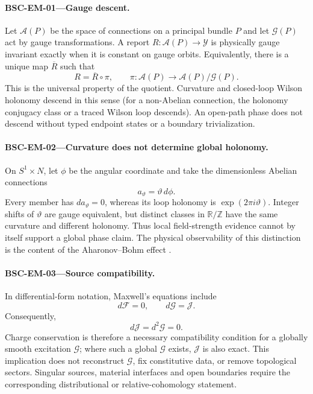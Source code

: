 \documentclass[11pt,a4paper]{article}
\theoremstyle{definition}
\theoremstyle{plain}
\theoremstyle{remark}
\begin{document}
\paragraph{\textbf{BSC-EM-01}---Gauge descent.}
Let \(\mathcal A(P)\) be the space of connections on a principal bundle \(P\)
and let \(\mathcal G(P)\) act by gauge transformations.  A report
\(R:\mathcal A(P)\to\mathcal Y\) is physically gauge invariant exactly when
it is constant on gauge orbits.  Equivalently, there is a unique map
\(\overline R\) such that
\[
R=\overline R\circ\pi,
\qquad
\pi:\mathcal A(P)\longrightarrow\mathcal A(P)/\mathcal G(P).
\]
This is the universal property of the quotient.  Curvature and closed-loop
Wilson holonomy descend in this sense (for a non-Abelian connection, the
holonomy conjugacy class or a traced Wilson loop descends).  An open-path
phase does not descend without typed endpoint states or a boundary
trivialization.

\paragraph{\textbf{BSC-EM-02}---Curvature does not determine global
holonomy.}
On \(S^1\times N\), let \(\phi\) be the angular coordinate and take the
dimensionless Abelian connections
\[
a_\vartheta=\vartheta\,d\phi.
\]
Every member has \(da_\vartheta=0\), whereas its loop holonomy is
\(\exp(2\pi i\vartheta)\).  Integer shifts of \(\vartheta\) are gauge
equivalent, but distinct classes in \(\mathbb R/\mathbb Z\) have the same
curvature and different holonomy.  Thus local field-strength evidence cannot
by itself support a global phase claim.  The physical observability of this
distinction is the content of the Aharonov--Bohm effect
\citep{aharonovbohm1959}.

\paragraph{\textbf{BSC-EM-03}---Source compatibility.}
In differential-form notation, Maxwell's equations include
\[
d\mathcal F=0,
\qquad
d\mathcal G=\mathcal J.
\]
Consequently,
\[
d\mathcal J=d^2\mathcal G=0.
\]
Charge conservation is therefore a necessary compatibility condition for a
globally smooth excitation \(\mathcal G\); where such a global
\(\mathcal G\) exists, \(\mathcal J\) is also exact.  This implication does
not reconstruct \(\mathcal G\), fix constitutive data, or remove topological
sectors.  Singular sources, material interfaces and open boundaries require
the corresponding distributional or relative-cohomology statement.
\end{document}
